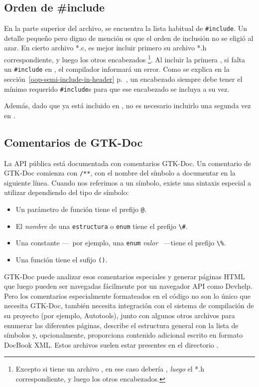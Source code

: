 \subsection{Orden de \#include}
En la parte superior del archivo, se encuentra la lista habitual de \lstinline{#include}. Un detalle pequeño pero digno de mención es que el orden de inclusión no se eligió al azar. En cierto archivo *.c, es mejor incluir primero su archivo *.h correspondiente, y luego los otros encabezados \footnote{Excepto si tiene un archivo , en ese caso debería , \emph{luego} el *.h correspondiente, y luego los otros encabezados.}. Al incluir la primera , si falta un \lstinline{#include} en , el compilador informará un error. Como se explica en la sección~\ref{oop-semi-include-in-header} p.~\pageref{oop-semi-include-in-header}, un encabezado siempre debe tener el mínimo requerido \lstinline{#include}s para que ese encabezado se incluya a su vez.

Además, dado que  ya está incluido en , no es necesario incluirlo una segunda vez en .

\subsection{Comentarios de GTK-Doc}
La API pública está documentada con comentarios GTK-Doc. Un comentario de GTK-Doc comienza con \lstinline{/**}, con el nombre del símbolo a documentar en la siguiente línea. Cuando nos referimos a un símbolo, existe una sintaxis especial a utilizar dependiendo del tipo de símbolo:
\begin{itemize}
    \item Un parámetro de función tiene el prefijo \lstinline{@}.
    \item El \emph{nombre} de una \lstinline{estructura} o \lstinline{enum} tiene el prefijo \lstinline{\#}.
    \item Una constante ---~por ejemplo, una \lstinline{enum} \emph{valor} ~---tiene el prefijo \lstinline{\%}.
    \item Una función tiene el sufijo \lstinline{()}.
\end{itemize}

GTK-Doc puede analizar esos comentarios especiales y generar páginas HTML que luego pueden ser navegadas fácilmente por un navegador API como Devhelp. Pero los comentarios especialmente formateados en el código no son lo único que necesita GTK-Doc, también necesita integración con el sistema de compilación de su proyecto (por ejemplo, Autotools), junto con algunos otros archivos para enumerar las diferentes páginas, describe el estructura general con la lista de símbolos y, opcionalmente, proporciona contenido adicional escrito en formato DocBook XML. Estos archivos suelen estar presentes en el directorio .

